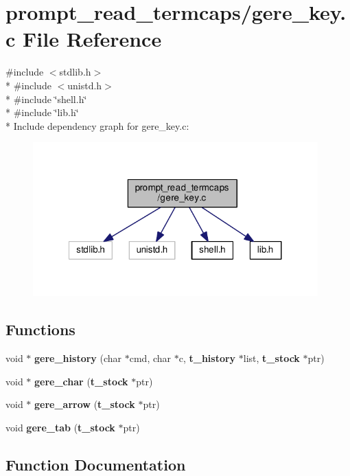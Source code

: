 \section{prompt\-\_\-read\-\_\-termcaps/gere\-\_\-key.c File Reference}
\label{gere__key_8c}
{\ttfamily \#include $<$stdlib.\-h$>$}\\*
{\ttfamily \#include $<$unistd.\-h$>$}\\*
{\ttfamily \#include \char`\"{}shell.\-h\char`\"{}}\\*
{\ttfamily \#include \char`\"{}lib.\-h\char`\"{}}\\*
Include dependency graph for gere\-\_\-key.\-c\-:\nopagebreak
\begin{figure}[H]
\begin{center}
\leavevmode
\includegraphics[width=311pt]{gere__key_8c__incl}
\end{center}
\end{figure}
\subsection*{Functions}
\begin{DoxyCompactItemize}
\item 
void $\ast$ {\bf gere\-\_\-history} (char $\ast$cmd, char $\ast$c, {\bf t\-\_\-history} $\ast$list, {\bf t\-\_\-stock} $\ast$ptr)
\item 
void $\ast$ {\bf gere\-\_\-char} ({\bf t\-\_\-stock} $\ast$ptr)
\item 
void $\ast$ {\bf gere\-\_\-arrow} ({\bf t\-\_\-stock} $\ast$ptr)
\item 
void {\bf gere\-\_\-tab} ({\bf t\-\_\-stock} $\ast$ptr)
\end{DoxyCompactItemize}


\subsection{Function Documentation}
